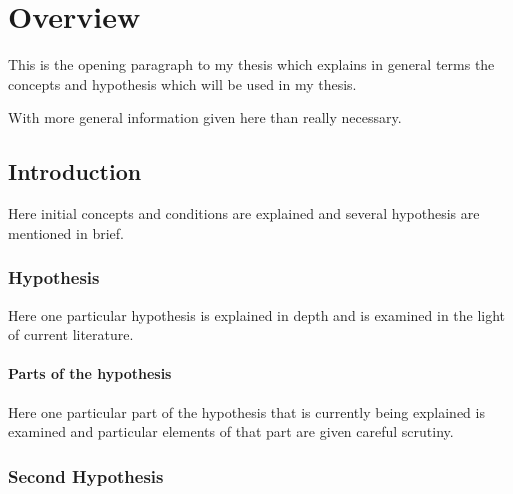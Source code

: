 \chapter{Overview}

This is the opening paragraph to my thesis which
explains in general terms the concepts and hypothesis
which will be used in my thesis.

With more general information given here than really
necessary.

\section{Introduction} \label{introSection}

Here initial concepts and conditions are explained and several hypothesis are mentioned in brief.

\subsection{Hypothesis}

Here one particular hypothesis is explained in depth and is examined in the light of current literature.

\subsubsection{Parts of the hypothesis}

Here one particular part of the hypothesis that is
currently being explained is examined and particular
elements of that part are given careful scrutiny.


\subsection{Second Hypothesis}

